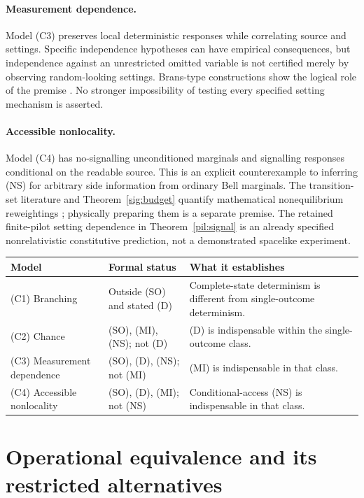 \documentclass[11pt,a4paper]{article}
\theoremstyle{definition}
\theoremstyle{remark}\newtheorem{remark}[theorem]{Remark}
\begin{document}
\paragraph{Measurement dependence.}
Model (C3) preserves local deterministic responses while correlating source and settings. Specific independence hypotheses can have empirical consequences, but independence against an unrestricted omitted variable is not certified merely by observing random-looking settings. Brans-type constructions show the logical role of the premise \cite{Brans88}. No stronger impossibility of testing every specified setting mechanism is asserted.

\paragraph{Accessible nonlocality.}
Model (C4) has no-signalling unconditioned marginals and signalling responses conditional on the readable source. This is an explicit counterexample to inferring (NS) for arbitrary side information from ordinary Bell marginals. The transition-set literature and Theorem~\ref{sig:budget} quantify mathematical nonequilibrium reweightings \cite{V02}; physically preparing them is a separate premise. The retained finite-pilot setting dependence in Theorem~\ref{pil:signal} is an already specified nonrelativistic constitutive prediction, not a demonstrated spacelike experiment.

\begin{center}\small
\begin{tabularx}{\textwidth}{@{}p{}p{}X@{}}\toprule
Model & Formal status & What it establishes\\\midrule
(C1) Branching & Outside (SO) and stated (D) & Complete-state determinism is different from single-outcome determinism.\\
(C2) Chance & (SO), (MI), (NS); not (D) & (D) is indispensable within the single-outcome class.\\
(C3) Measurement dependence & (SO), (D), (NS); not (MI) & (MI) is indispensable in that class.\\
(C4) Accessible nonlocality & (SO), (D), (MI); not (NS) & Conditional-access (NS) is indispensable in that class.\\\bottomrule
\end{tabularx}
\end{center}

\section{Operational equivalence and its restricted alternatives}
\label{op:section}
\end{document}
